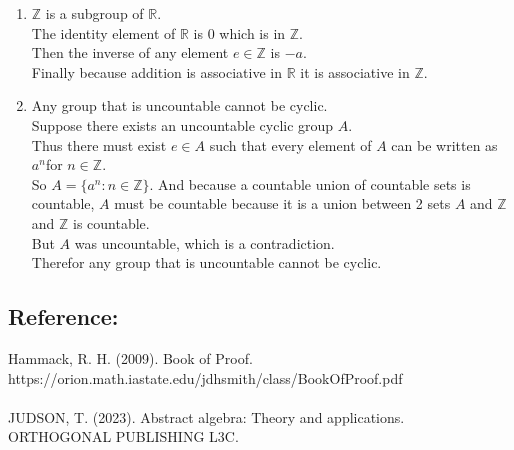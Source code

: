 \documentclass[sigconf]{article}
\begin{document}
\begin{enumerate}
  \item $\mathbb{Z}$ is a subgroup of $\mathbb{R}$.\\
      The identity element of $\mathbb{R}$ is $0$ which is in $\mathbb{Z}$.\\
      Then the inverse of any element $e\in\mathbb{Z}$ is $-a$.\\
      Finally because addition is associative in $\mathbb{R}$ it is associative in $\mathbb{Z}$.
  \item Any group that is uncountable cannot be cyclic.\\
        Suppose there exists an uncountable cyclic group $A$.\\
        Thus there must exist $e\in A$ such that every element of $A$ can be written as $a^n$for $n\in\mathbb{Z}$.\\
        So $A=\{a^n:n\in\mathbb{Z}\}$.
        And because a countable union of countable sets is countable, $A$ must be countable because it is a union between 2 sets $A$ and $\mathbb{Z}$ and $\mathbb{Z}$ is countable.\\
        But $A$ was uncountable, which is a contradiction.\\
        Therefor any group that is uncountable cannot be cyclic.
\end{enumerate}



\subsection*{Reference:}
Hammack, R. H. (2009). Book of Proof.\\ https://orion.math.iastate.edu/jdhsmith/class/BookOfProof.pdf
\\
\\
JUDSON, T. (2023). Abstract algebra: Theory and applications. ORTHOGONAL PUBLISHING L3C.



\end{document}
